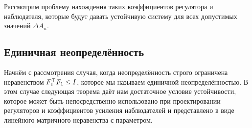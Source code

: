 Рассмотрим проблему нахождения таких коэффициентов регулятора и наблюдателя, которые будут давать устойчивую систему для всех допустимых значений $\Delta {A}_n$.

\subsection{Единичная неопределённость}\label{sec:ch4/sect2/sub1}

Начнём с рассмотрения случая, когда неопределённость строго ограничена неравенством ${F}_1^\top{F}_1\leq {I}$, которое мы называем единичной неопределённостью. В этом случае следующая теорема даёт нам достаточное условие устойчивости, которое может быть непосредственно использовано при проектировании регуляторов и коэффициентов усиления наблюдателей и представлено в виде линейного матричного неравенства с параметром.

